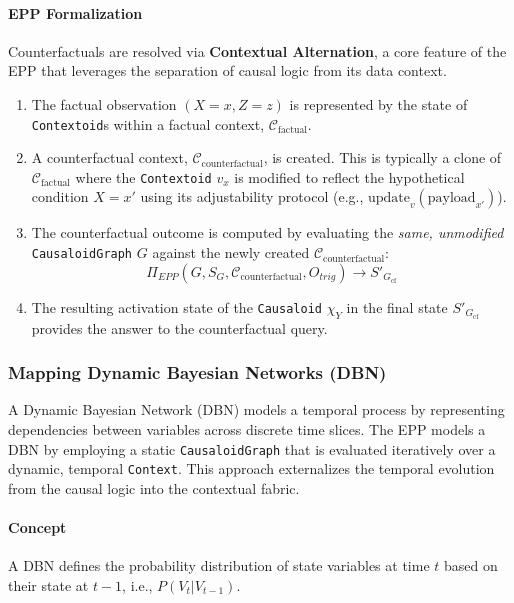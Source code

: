 \paragraph{EPP Formalization}
Counterfactuals are resolved via \textbf{Contextual Alternation}, a core feature of the EPP that leverages the separation of causal logic from its data context.
\begin{enumerate}
    \item The factual observation \((X=x, Z=z)\) is represented by the state of \texttt{Contextoid}s within a factual context, \(\mathcal{C}_{\text{factual}}\).
    \item A counterfactual context, \(\mathcal{C}_{\text{counterfactual}}\), is created. This is typically a clone of \(\mathcal{C}_{\text{factual}}\) where the \texttt{Contextoid} \(v_x\) is modified to reflect the hypothetical condition \(X=x'\) using its adjustability protocol (e.g., \(\text{update}_v(\text{payload}_{x'})\)).
    \item The counterfactual outcome is computed by evaluating the \textit{same, unmodified} \texttt{CausaloidGraph} \(G\) against the newly created \(\mathcal{C}_{\text{counterfactual}}\):
    \[ \Pi_{EPP}(G, S_G, \mathcal{C}_{\text{counterfactual}}, O_{trig}) \to S'_{G_{\text{cf}}} \]
    \item The resulting activation state of the \texttt{Causaloid} \(\chi_Y\) in the final state \(S'_{G_{\text{cf}}}\) provides the answer to the counterfactual query.
\end{enumerate}




\subsubsection{Mapping Dynamic Bayesian Networks (DBN)}
\label{subsec:formalization_mapping_dbn}

A Dynamic Bayesian Network (DBN) models a temporal process by representing dependencies between variables across discrete time slices. The EPP models a DBN by employing a static \texttt{CausaloidGraph} that is evaluated iteratively over a dynamic, temporal \texttt{Context}. This approach externalizes the temporal evolution from the causal logic into the contextual fabric.

\paragraph{Concept}
A DBN defines the probability distribution of state variables at time \(t\) based on their state at \(t-1\), i.e., \(P(V_t | V_{t-1})\).

